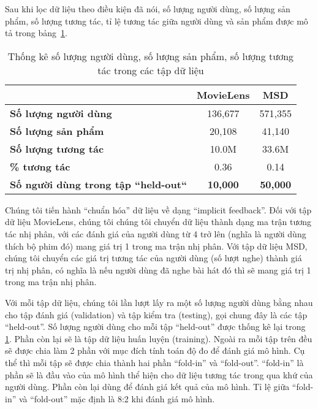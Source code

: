 Sau khi lọc dữ liệu theo điều kiện đã nói, số lượng người dùng, số lượng sản phẩm, số lượng tương tác, tỉ lệ tương tác giữa người dùng và sản phẩm được mô tả trong bảng~\ref{table_dataset}.
\begin{table}[]
\centering
    \begin{tabular}{|l|c|c|}
    \hline
                                                & \textbf{MovieLens} & \textbf{MSD}    \\ \hline
    \textbf{Số lượng người dùng}                  & 136,677            & 571,355         \\ \hline
    \textbf{Số lượng sản phẩm}                    & 20,108             & 41,140          \\ \hline
    \textbf{Số lượng tương tác}                   & 10.0M              & 33.6M           \\ \hline
    \textbf{\% tương tác}                         & 0.36               & 0.14            \\ \hline
    \textbf{Số người dùng trong tập ``held-out``} & \textbf{10,000}    & \textbf{50,000} \\ \hline
    \end{tabular}
   
    \caption{Thống kê số lượng người dùng, số lượng sản phẩm, số lượng tương tác trong các tập dữ liệu}
    \label{table_dataset}    
\end{table}


Chúng tôi tiến hành ``chuẩn hóa'' dữ liệu về dạng ``implicit feedback''. Đối với tập dữ liệu MovieLens, chúng tôi 
chúng tôi chuyển dữ liệu thành dạng ma trận tương tác nhị phân, với các đánh giá của người dùng từ 4 trở lên (nghĩa là người dùng thích bộ phim đó) mang giá trị 1 trong ma trận nhị phân.
Với tập dữ liệu MSD, chúng tôi chuyển các giá trị tương tác của người dùng (số lượt nghe) thành giá trị nhị phân, có nghĩa là nếu người dùng đã nghe bài hát đó thì sẽ mang giá trị 1 trong ma trận nhị phân.

Với mỗi tập dữ liệu, chúng tôi lần lượt lấy ra một số lượng người dùng bằng nhau cho tập đánh giá (validation) và tập kiểm tra (testing), gọi chung đây là các tập ``held-out''. 
Số lượng người dùng cho mỗi tập ``held-out'' được thống kê lại trong \ref{table_dataset}.
Phần còn lại sẽ là tập dữ liệu huấn luyện (training).
Ngoài ra mỗi tập trên đều sẽ được chia làm 2 phần với mục đích tính toán độ đo để đánh giá mô hình.
Cụ thể thì mỗi tập sẽ được chia thành hai phần ``fold-in'' và ``fold-out''.
``fold-in'' là phần sẽ là đầu vào của mô hình thể hiện cho dữ liệu tương tác trong qua khứ của người dùng. 
Phần còn lại dùng để đánh giá kết quả của mô hình.
Tỉ lệ giữa ``fold-in'' và ``fold-out'' mặc định là 8:2 khi đánh giá mô hình.


